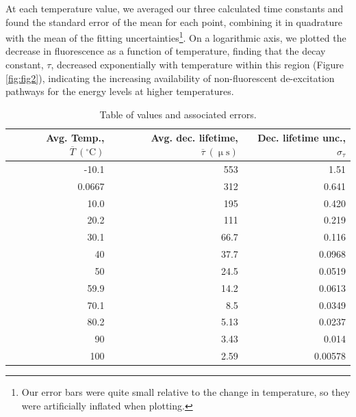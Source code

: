 \documentclass[12pt]{report}
\begin{document}
At each temperature value, we averaged our three calculated time constants and found the standard error of the mean for each point, combining it in quadrature with the mean of the fitting uncertainties\footnote{Our error bars were quite small relative to the change in temperature, so they were artificially inflated when plotting.}. On a logarithmic axis, we plotted the decrease in fluorescence as a function of temperature, finding that the decay constant, $\tau$, decreased exponentially with temperature within this region (Figure\,\ref{fig:fig2}), indicating the increasing availability of non-fluorescent de-excitation pathways for the  energy levels at higher temperatures.

\begin{table}[ht]
\centering
\begin{tabular}{rrr}
\hline
   Avg. Temp., $\overline{T}\ (\mathrm{^{\circ}C})$ &   Avg. dec. lifetime, $\overline{\tau}\ (\upmu \mathrm{s})$ &   Dec. lifetime unc., $\sigma_{\tau}$ \\
\hline
      -10.1    &           553    &                      1.51    \\
        0.0667 &           312    &                      0.641   \\
       10.0    &           195    &                      0.420   \\
       20.2    &           111    &                      0.219   \\
       30.1    &            66.7  &                      0.116   \\
       40      &            37.7  &                      0.0968  \\
       50      &            24.5  &                      0.0519  \\
       59.9    &            14.2  &                      0.0613  \\
       70.1    &             8.5  &                      0.0349  \\
       80.2    &             5.13 &                      0.0237  \\
       90      &             3.43 &                      0.014   \\
      100      &             2.59 &                      0.00578 \\
\hline
\end{tabular}
\caption{Table of values and associated errors.}
\label{tab:sample}
\end{table}

\printbibliography
\end{document}

